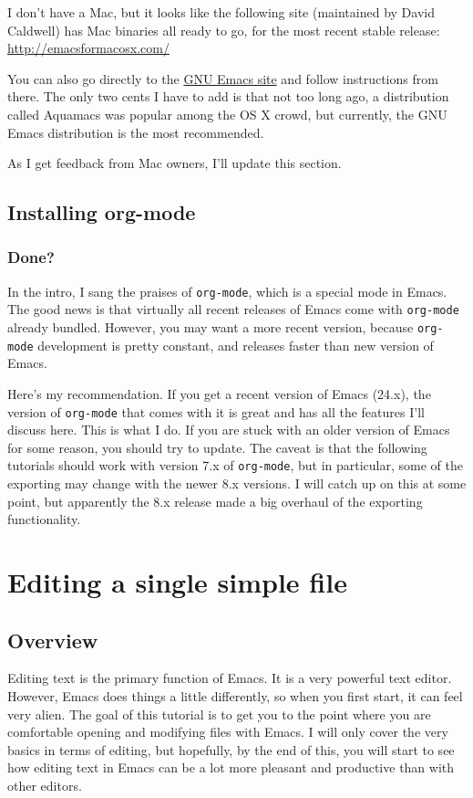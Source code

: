 \documentclass{article}
\begin{document}
I don't have a Mac, but it looks like the following site (maintained by David Caldwell) has Mac binaries all ready to go, for the most recent stable release: \href{http://emacsformacosx.com/}{http://emacsformacosx.com/}

You can also go directly to the \href{http://www.gnu.org/software/emacs/}{GNU Emacs site} and follow instructions from there.  The only two cents I have to add is that not too long ago, a distribution called Aquamacs was popular among the OS X crowd, but currently, the GNU Emacs distribution is the most recommended.

As I get feedback from Mac owners, I'll update this section.
\subsection{Installing org-mode}
\label{sec-3-5}
\subsubsection{Done?}
\label{sec-3-5-1}

In the intro, I sang the praises of \texttt{org-mode}, which is a special mode in Emacs. The good news is that virtually all recent releases of Emacs come with \texttt{org-mode} already bundled.  However, you may want a more recent version, because \texttt{org-mode} development is pretty constant, and releases faster than new version of Emacs.

Here's my recommendation.  If you get a recent version of Emacs (24.x), the version of \texttt{org-mode} that comes with it is great and has all the features I'll discuss here.  This is what I do.  If you are stuck with an older version of Emacs for some reason, you should try to update.  The caveat is that the following tutorials should work with version 7.x of \texttt{org-mode}, but in particular, some of the exporting may change with the newer 8.x versions.  I will catch up on this at some point, but apparently the 8.x release made a big overhaul of the exporting functionality.
\section{Editing a single simple file}
\label{sec-4}
\label{editsimple}
\subsection{Overview}
\label{sec-4-1}

Editing text is the primary function of Emacs. It is a very powerful text editor. However, Emacs does things a little differently, so when you first start, it can feel very alien. The goal of this tutorial is to get you to the point where you are comfortable opening and modifying files with Emacs. I will only cover the very basics in terms of editing, but hopefully, by the end of this, you will start to see how editing text in Emacs can be a lot more pleasant and productive than with other editors.
\end{document}
